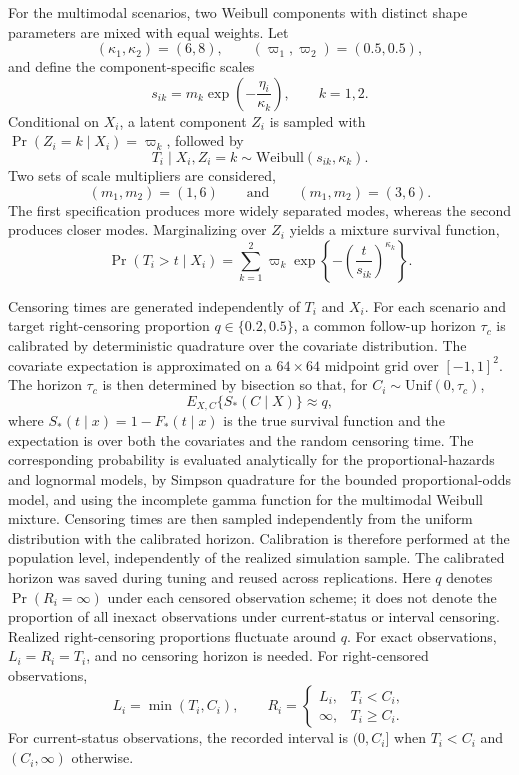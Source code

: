 \documentclass[11pt]{article}
\numberwithin{equation}{section}
\begin{document}
For the multimodal scenarios, two Weibull components with distinct shape parameters are mixed with equal weights. Let
\[
    (\kappa_1,\kappa_2)=(6,8),
    \qquad
    (\varpi_1,\varpi_2)=(0.5,0.5),
\]
and define the component-specific scales
\[
    s_{ik}
    =m_k\exp\left(-\frac{\eta_i}{\kappa_k}\right),
    \qquad k=1,2.
\]
Conditional on $X_i$, a latent component $Z_i$ is sampled with
$\Pr(Z_i=k\mid X_i)=\varpi_k$, followed by
\[
    T_i\mid X_i,Z_i=k
    \sim\mathrm{Weibull}(s_{ik},\kappa_k).
\]
Two sets of scale multipliers are considered,
\[
    (m_1,m_2)=(1,6)
    \qquad\text{and}\qquad
    (m_1,m_2)=(3,6).
\]
The first specification produces more widely separated modes, whereas the second produces closer modes. Marginalizing over $Z_i$ yields a mixture survival function,
\[
    \Pr(T_i>t\mid X_i)
    =
    \sum_{k=1}^2
    \varpi_k\exp\left\{-\left(\frac{t}{s_{ik}}\right)^{\kappa_k}\right\}.
\]

Censoring times are generated independently of $T_i$ and $X_i$. For each scenario and target right-censoring proportion $q\in\{0.2,0.5\}$, a common follow-up horizon $\tau_c$ is calibrated by deterministic quadrature over the covariate distribution. The covariate expectation is approximated on a $64\times64$ midpoint grid over $[-1,1]^2$. The horizon $\tau_c$ is then determined by bisection so that, for $C_i\sim\mathrm{Unif}(0,\tau_c)$,
\[
    E_{X,C}\{S_*(C\mid X)\}\approx q,
\]
where $S_*(t\mid x)=1-F_*(t\mid x)$ is the true survival function and the expectation is over both the covariates and the random censoring time. The corresponding probability is evaluated analytically for the proportional-hazards and lognormal models, by Simpson quadrature for the bounded proportional-odds model, and using the incomplete gamma function for the multimodal Weibull mixture. Censoring times are then sampled independently from the uniform distribution with the calibrated horizon.
Calibration is therefore performed at the population level, independently of the realized simulation sample. The calibrated horizon was saved during tuning and reused across replications. Here $q$ denotes $\Pr(R_i=\infty)$ under each censored observation scheme; it does not denote the proportion of all inexact observations under current-status or interval censoring. Realized right-censoring proportions fluctuate around $q$. For exact observations, $L_i=R_i=T_i$, and no censoring horizon is needed. For right-censored observations,
\[
    L_i=\min(T_i,C_i),
    \qquad
    R_i=
    \begin{cases}
    L_i,&T_i<C_i,\\
    \infty,&T_i\geq C_i.
    \end{cases}
\]
For current-status observations, the recorded interval is $(0,C_i]$ when $T_i<C_i$ and $(C_i,\infty)$ otherwise.
\end{document}
